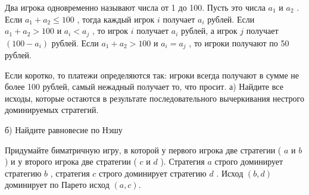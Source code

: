 \begin{problem}
 Два игрока одновременно называют числа от 1 до 100. Пусть это числа  $a_{1} $  и  $a_{2} $ . Если  $a_{1} +a_{2} \le 100$ , тогда каждый игрок  $i$  получает  $a_{i} $  рублей. Если  $a_{1} +a_{2} >100$  и  $a_{i} <a_{j} $ , то игрок  $i$  получает  $a_{i} $  рублей, а игрок  $j$  получает  $\left(100-a_{i} \right)$  рублей. Если  $a_{1} +a_{2} >100$  и  $a_{i} =a_{j} $ , то игроки получают по 50 рублей. \par
Если коротко, то платежи определяются так: игроки всегда получают в сумме не более 100 рублей, самый нежадный получает то, что просит.
а) Найдите все исходы, которые остаются в результате последовательного вычеркивания нестрого доминируемых стратегий.

б) Найдите равновесие по Нэшу



\begin{sol}

\end{sol}
\end{problem}



\begin{problem}

Придумайте биматричную игру, в которой у первого игрока две стратегии ( $a$  и  $b$ ) и у второго игрока две стратегии ( $c$  и  $d$ ). Стратегия  $a$  строго доминирует стратегию  $b$ , стратегия  $c$  строго доминирует стратегию  $d$ . Исход  $\left(b,d\right)$  доминирует по Парето исход  $\left(a,c\right)$.



\begin{sol}

\end{sol}
\end{problem}




